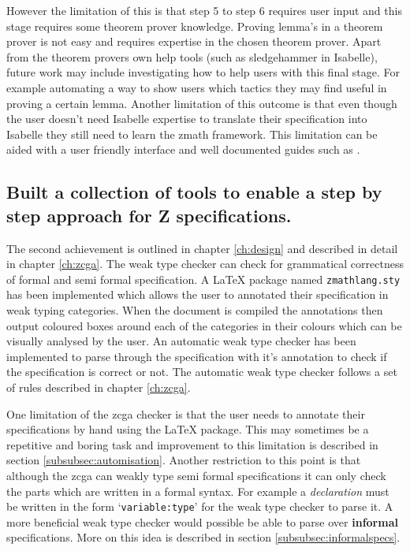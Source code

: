 However the limitation of this is that step 5 to step 6 requires user input and
this stage requires some theorem prover knowledge. Proving lemma's in a theorem
prover is not easy and requires expertise in the chosen theorem prover. Apart
from the theorem provers own help tools (such as sledgehammer in Isabelle),
future work may include investigating how to help users with this final stage.
For example automating a way to show users which tactics they may find useful in
proving a certain lemma. Another limitation of this outcome is that even though
the user doesn't need Isabelle expertise to translate their specification into
Isabelle they still need to learn the \gls{zmath} framework. This limitation can
be aided with a user friendly interface and well documented guides such as
\cite{zmathuser}.

\subsection{Built a collection of tools to enable a step by step approach for Z
specifications.}

The second achievement is outlined in chapter \ref{ch:design} and described in detail
in chapter \ref{ch:zcga}. The weak type checker can check for grammatical
correctness of formal and semi formal specification. A \LaTeX{} package named
\texttt{zmathlang.sty} has been implemented which allows the user to annotated
their specification in weak typing categories. When the document is compiled the
annotations then output coloured boxes around each of the categories in their
colours which can be visually analysed by the user. An automatic weak type
checker has been implemented to parse through the specification with it's
annotation to check if the specification is correct or not. The automatic weak
type checker follows a set of rules described in chapter \ref{ch:zcga}.

One limitation of the \gls{zcga} checker is that the user needs to annotate
their specifications by hand using the \LaTeX{} package. This may sometimes be a
repetitive and boring task and improvement to this limitation is described in
section \ref{subsubsec:automisation}. Another restriction to this point is that
although the \gls{zcga} can weakly type semi formal specifications it can only
check the parts which are written in a formal syntax. For example a
\textit{declaration} must be written in the form `\texttt{variable:type}' for
the weak type checker to parse it. A more beneficial weak type checker would
possible be able to parse over \textbf{informal} specifications. More on this
idea is described in section \ref{subsubsec:informalspecs}.

